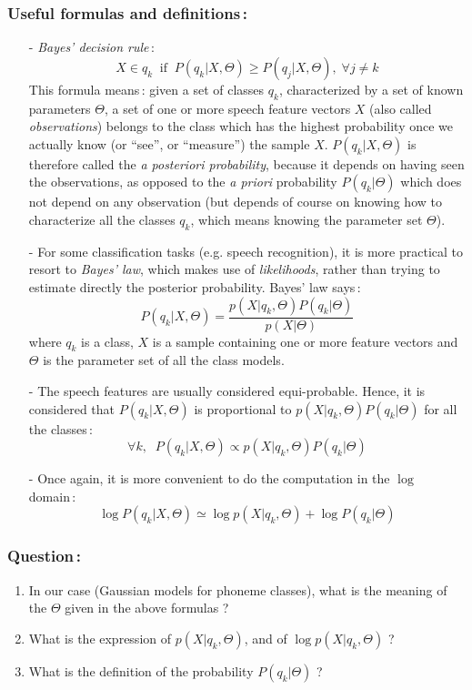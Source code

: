 \documentclass[twoside,a4paper,titlepage]{article}
\begin{document}
\subsubsection*{Useful formulas and definitions\,:}
\begin{itemize}
\item[-] {\em Bayes' decision rule}\,:
\[
	X \in q_k \;\; \mbox{if} \;\; P(q_k|X,\Theta) \geq P(q_j|X,\Theta), \; \forall j \neq k
\]
This formula means\,: given a set of classes $q_k$, characterized by a set
of known parameters $\Theta$, a set of one or more speech feature vectors
$X$ (also called {\em observations}) belongs to the class which has the
highest probability once we actually know (or ``see'', or ``measure'') the
sample $X$. $P(q_k|X,\Theta)$ is therefore called the {\em a posteriori
probability}, because it depends on having seen the observations, as
opposed to the {\em a priori} probability $P(q_k|\Theta)$ which does not
depend on any observation (but depends of course on knowing how to
characterize all the classes $q_k$, which means knowing the parameter set
$\Theta$).
\item[-] For some classification tasks (e.g. speech recognition), it is
more practical to resort to {\em Bayes' law}, which makes use of {\em
likelihoods}, rather than trying to estimate directly the posterior
probability. Bayes' law says\,:
\[
P(q_k|X,\Theta) = \frac{p(X|q_k,\Theta) P(q_k|\Theta)}{p(X|\Theta)}
\] 
where $q_k$ is a class, $X$ is a sample containing one or more feature
vectors and $\Theta$ is the parameter set of all the class models.
%
\item[-] The speech features are usually considered equi-probable. Hence,
it is considered that $P(q_k|X,\Theta)$ is proportional to $p(X|q_k,\Theta)
P(q_k|\Theta)$ for all the classes\,:
\[
\forall k, \;\; P(q_k|X,\Theta) \propto p(X|q_k,\Theta) P(q_k|\Theta)
\]
%
\item[-] Once again, it is more convenient to do the computation in the
$\log$ domain\,:
\[
\log P(q_k|X,\Theta) \simeq \log p(X|q_k,\Theta) + \log P(q_k|\Theta)
\]
\end{itemize}

\subsubsection*{Question\,:}
\begin{enumerate}
\item In our case (Gaussian models for phoneme classes), what is the
meaning of the $\Theta$ given in the above formulas ?
\item What is the expression of $p(X|q_k,\Theta)$, and of $\log
p(X|q_k,\Theta)$ ?
\item What is the definition of the probability $P(q_k|\Theta)$ ?
\end{enumerate}
\end{document}
